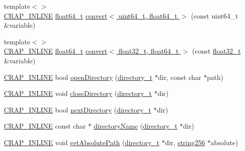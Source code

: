 \begin{DoxyCompactItemize}
\item 
{\footnotesize template$<$$>$ }\\\hyperlink{config__x86_8h_a5a40526b8d842e7ff731509998bb0f1c}{C\+R\+A\+P\+\_\+\+I\+N\+L\+I\+N\+E} \hyperlink{crap__types_8h_ac55f3ae81b5bc9053760baacf57e47f4}{float64\+\_\+t} \hyperlink{namespacecrap_af79e9627671458cbbb0b8cd5ee98c329}{convert$<$ uint64\+\_\+t, float64\+\_\+t $>$} (const uint64\+\_\+t \&variable)
\item 
{\footnotesize template$<$$>$ }\\\hyperlink{config__x86_8h_a5a40526b8d842e7ff731509998bb0f1c}{C\+R\+A\+P\+\_\+\+I\+N\+L\+I\+N\+E} \hyperlink{crap__types_8h_ac55f3ae81b5bc9053760baacf57e47f4}{float64\+\_\+t} \hyperlink{namespacecrap_aff5a142b9aec57b7f243d2ad836ba228}{convert$<$ float32\+\_\+t, float64\+\_\+t $>$} (const \hyperlink{crap__types_8h_a4611b605e45ab401f02cab15c5e38715}{float32\+\_\+t} \&variable)
\item 
\hyperlink{config__x86_8h_a5a40526b8d842e7ff731509998bb0f1c}{C\+R\+A\+P\+\_\+\+I\+N\+L\+I\+N\+E} bool \hyperlink{namespacecrap_aa5e6fb0d94b627139d54baa15235de7c}{open\+Directory} (\hyperlink{namespacecrap_a82911918170604f7fc9e93d66891069c}{directory\+\_\+t} $\ast$dir, const char $\ast$path)
\item 
\hyperlink{config__x86_8h_a5a40526b8d842e7ff731509998bb0f1c}{C\+R\+A\+P\+\_\+\+I\+N\+L\+I\+N\+E} void \hyperlink{namespacecrap_aafb3fe5f27c077088ed8fd540e59a4b6}{close\+Directory} (\hyperlink{namespacecrap_a82911918170604f7fc9e93d66891069c}{directory\+\_\+t} $\ast$dir)
\item 
\hyperlink{config__x86_8h_a5a40526b8d842e7ff731509998bb0f1c}{C\+R\+A\+P\+\_\+\+I\+N\+L\+I\+N\+E} bool \hyperlink{namespacecrap_a0daff76fe14bd465cad2439d3d8a5b39}{next\+Directory} (\hyperlink{namespacecrap_a82911918170604f7fc9e93d66891069c}{directory\+\_\+t} $\ast$dir)
\item 
\hyperlink{config__x86_8h_a5a40526b8d842e7ff731509998bb0f1c}{C\+R\+A\+P\+\_\+\+I\+N\+L\+I\+N\+E} const char $\ast$ \hyperlink{namespacecrap_adb591d0a2e2f6adc6526bfb4e5ae3d31}{directory\+Name} (\hyperlink{namespacecrap_a82911918170604f7fc9e93d66891069c}{directory\+\_\+t} $\ast$dir)
\item 
\hyperlink{config__x86_8h_a5a40526b8d842e7ff731509998bb0f1c}{C\+R\+A\+P\+\_\+\+I\+N\+L\+I\+N\+E} void \hyperlink{namespacecrap_a42f443e872ef5659236a59ebf5ae8a8e}{get\+Absolute\+Path} (\hyperlink{namespacecrap_a82911918170604f7fc9e93d66891069c}{directory\+\_\+t} $\ast$dir, \hyperlink{namespacecrap_af674ac1cc38a09c563c68dfc3b15e554}{string256} $\ast$absolute)

\end{DoxyCompactItemize}

